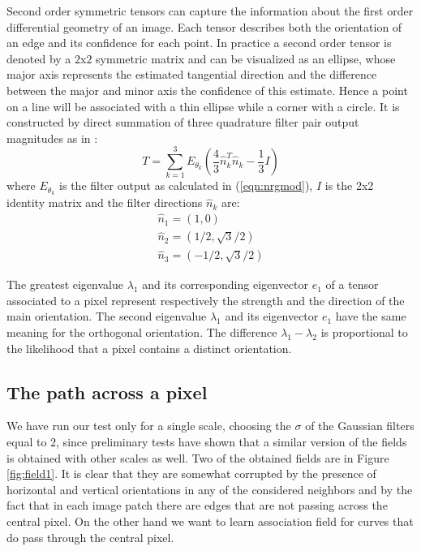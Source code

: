 \documentclass{llncs}
\begin{document}
Second order symmetric tensors can capture the information about the first
order differential geometry of an image. Each tensor describes both the
orientation of an edge and its confidence for each point.
In practice a second order tensor is denoted by a $2$x$2$ symmetric matrix
and can be visualized as an ellipse, whose major axis represents the estimated tangential
direction and the difference between the major and minor axis the confidence
of this estimate. Hence a point on a line will be associated with a thin
ellipse while a corner with a circle.
It is constructed by direct summation of three quadrature filter pair output magnitudes as in \cite{Knutsson89}:
\begin{equation} \label{eqn:sumquad}
T=\sum^3_{k=1}E_{\theta_k}\left(\frac{4}{3}\hat{n}_k^T \hat{n}_k-\frac{1}{3}I\right)
\end{equation}
where $E_{\theta_k}$ is the filter output as calculated in (\ref{eqn:nrgmod}), $I$ is the 2x2 identity matrix and the filter directions $\hat{n}_k$ are:
\begin{equation} \label{eqn:fildir}
\begin{array}{lll}
\hat{n}_1=\left(1,0\right) \\
\hat{n}_2=\left(1/2,\sqrt{3}/2\right) \\
\hat{n}_3=\left(-1/2,\sqrt{3}/2\right)
\end{array}
\end{equation}

The greatest eigenvalue $\lambda_1$ and its corresponding eigenvector $e_1$ of a tensor associated to a pixel represent respectively the strength and the direction of the main orientation. The second eigenvalue $\lambda_1$ and its eigenvector $e_1$ have the same meaning for the orthogonal orientation. The difference $\lambda_1-\lambda_2$ is proportional to the likelihood that a pixel contains a distinct orientation.

\subsection{The path across a pixel}
\label{sec:ass_pre_res}
We have run our test only for a single scale, choosing the $\sigma$ of the Gaussian filters
equal to $2$, since preliminary tests have shown that a similar version of the fields is obtained with other scales as well.
Two of the obtained fields are in Figure \ref{fig:field1}. It is clear that they are somewhat corrupted by the presence of horizontal and vertical orientations in any of the considered neighbors and by the fact that
in each image patch there are edges
that are not passing across the central pixel. On the other hand we want to learn association field for curves that do pass through the central pixel.
\end{document}
